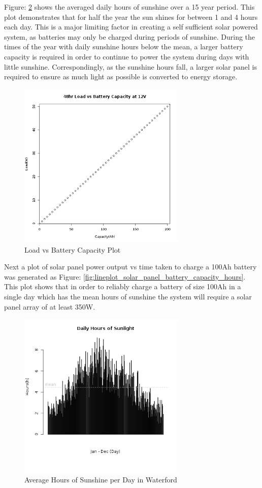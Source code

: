 \documentclass[runningheads,a4paper]{llncs}
\begin{document}
Figure: \ref{fig:barplot_hours_sunshine_waterford} shows the averaged daily hours of sunshine over a 15 year period. This plot demonstrates that for half the year the sun shines for between 1 and 4 hours each day. This is a major limiting factor in creating a self sufficient solar powered system, as batteries may only be charged during periods of sunshine. During the times of the year with daily sunshine hours below the mean, a larger battery capacity is required in order to continue to power the system during days with little sunshine. Correspondingly, as the sunshine hours fall, a larger solar panel is required to ensure as much light as possible is converted to energy storage.

%
\begin{figure}[!htb]
	\centering
	\includegraphics[width=8cm]{images/64}
	\caption{Load vs Battery Capacity Plot}
	\label{fig:lineplot_load_battery_capacity}
\end{figure}
%

Next a plot of solar panel power output vs time taken to charge a 100Ah battery was generated as Figure: \ref{fig:lineplot_solar_panel_battery_capacity_hours}. This plot shows that in order to reliably charge a battery of size 100Ah in a single day which has the mean hours of sunshine the system will require a solar panel array of at least 350W.

%
\begin{figure}[!htb]
	\centering
	\includegraphics[width=8cm]{images/66}
	\caption{Average Hours of Sunshine per Day in Waterford}
	\label{fig:barplot_hours_sunshine_waterford}
\end{figure}
%
\end{document}

